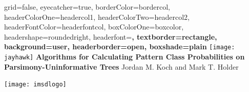 \documentclass[a0paper,landscape]{baposter}
\begin{document}

\background{
}

\begin{poster}{
	grid=false,
	eyecatcher=true, 
	borderColor=bordercol,
	headerColorOne=headercol1,
	headerColorTwo=headercol2,
	headerFontColor=headerfontcol,
	boxColorOne=boxcolor,
	headershape=roundedright,
	headerfont=\Large\sf\bf,
	textborder=rectangle,
	background=user,
	headerborder=open,
  boxshade=plain
}
{
\texttt{[image: jayhawk]}
}
{\bf
	Algorithms for Calculating Pattern Class Probabilities on Parsimony-Uninformative Trees
}
{
	\vspace{0em} Jordan M. Koch and Mark T. Holder\\
}
{

\setlength\fboxsep{0pt}
\setlength\fboxrule{0.5pt}
			\texttt{[image: imsdlogo]}
}


\end{poster}
\end{document}
